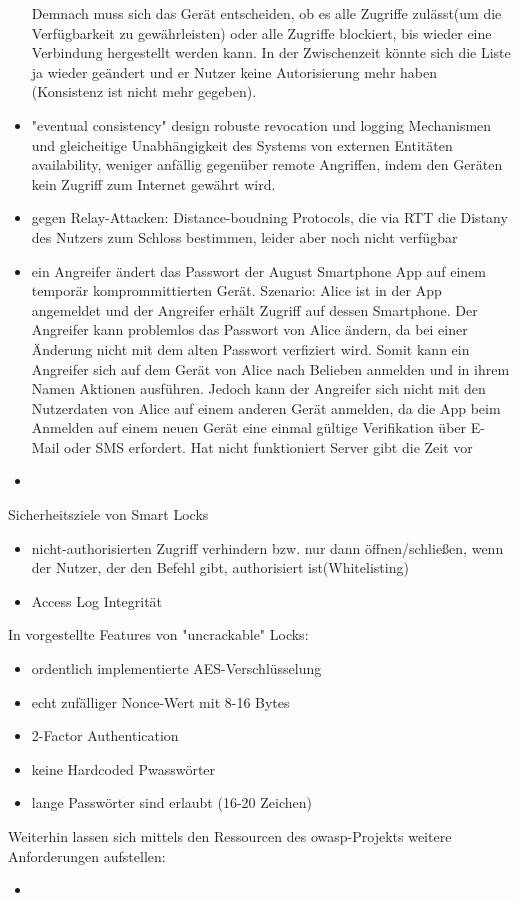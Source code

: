 \begin{itemize}
        Demnach muss sich das Gerät entscheiden, ob es alle Zugriffe zulässt(um die Verfügbarkeit zu gewährleisten) oder alle Zugriffe blockiert, bis wieder eine Verbindung hergestellt werden kann.
        In der Zwischenzeit könnte sich die Liste ja wieder geändert und er Nutzer keine Autorisierung mehr haben (Konsistenz ist nicht mehr gegeben).
        \item \textrightarrow "eventual consistency" design \textrightarrow robuste revocation und logging Mechanismen und gleicheitige Unabhängigkeit des Systems von externen Entitäten\cite{Ho2016} \textrightarrow availability, weniger anfällig gegenüber remote Angriffen, indem den Geräten kein Zugriff zum Internet gewährt wird.
        \item gegen Relay-Attacken: Distance-boudning Protocols, die via RTT die Distany des Nutzers zum Schloss bestimmen, leider aber noch nicht verfügbar\cite{Ho2016} \item ein Angreifer ändert das Passwort der August Smartphone App auf einem temporär komprommittierten Gerät.
	        Szenario: Alice ist in der App angemeldet und der Angreifer erhält Zugriff auf dessen Smartphone.
	        Der Angreifer kann problemlos das Passwort von Alice ändern, da bei einer Änderung nicht mit dem alten Passwort verfiziert wird.
	        Somit kann ein Angreifer sich auf dem Gerät von Alice nach Belieben anmelden und in ihrem Namen Aktionen ausführen.
	        Jedoch kann der Angreifer sich nicht mit den Nutzerdaten von Alice auf einem anderen Gerät anmelden, da die App beim Anmelden auf einem neuen Gerät eine einmal gültige Verifikation über E-Mail oder SMS erfordert.
	        Hat nicht funktioniert \textrightarrow Server gibt die Zeit vor \cite{Fuller2017}
        \item 
    \end{itemize}
    
    Sicherheitsziele von Smart Locks\cite{Ho2016}
    \begin{itemize}
        \item nicht-authorisierten Zugriff verhindern bzw. nur dann öffnen/schließen, wenn der Nutzer, der den Befehl gibt, authorisiert ist(Whitelisting)
        \item Access Log Integrität
    \end{itemize}
    
    In \cite{Rose2016} vorgestellte Features von "uncrackable" Locks:
    \begin{itemize}
        \item ordentlich implementierte AES-Verschlüsselung
        \item echt zufälliger Nonce-Wert mit 8-16 Bytes
        \item 2-Factor Authentication
        \item keine Hardcoded Pwasswörter
        \item lange Passwörter sind erlaubt (16-20 Zeichen)
    \end{itemize}
	
	Weiterhin lassen sich mittels den Ressourcen des \gls{owasp}-Projekts\cite{Miessler2015}\cite{Miessler2015a} weitere Anforderungen aufstellen:
	\begin{itemize}
	    \item 
	\end{itemize}
